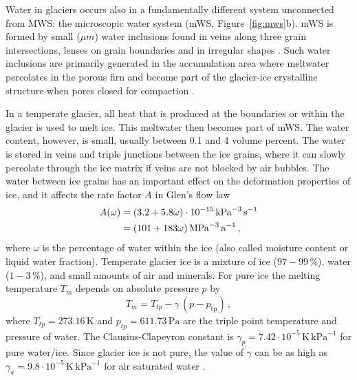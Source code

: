 \documentclass[11pt,a4paper,halfparskip]{scrartcl}
\newcommand{\unit}[1]{\ensuremath{\,\mathrm{#1}}}
\begin{document}
Water in glaciers occurs also in a fundamentally different system unconnected from MWS: the microscopic water system (mWS, Figure~\ref{fig:mws}b). mWS is formed by small ($\mu m$) water inclusions found in veins along three grain intersections, lenses on grain boundaries and in irregular shapes \citep{RaymondHarrison1975,Nye1989,Mader1992,FountainWalder1998}. Such water inclusions are primarily generated in the accumulation area where meltwater percolates in the porous firn and become part of the glacier-ice crystalline structure when pores closed for compaction \citep{Paterson1971,Lliboutry1976,Pettersson2004}.


In a temperate glacier, all heat that is produced at the boundaries or within
the glacier is used to melt ice. This meltwater then becomes part of mWS. The water content, however, is small, usually
between 0.1 and 4 volume percent.  The water is stored in veins and triple
junctions between the ice grains, where it can slowly percolate through the
ice matrix if veins are not blocked by air bubbles.  The water between ice
grains has an important effect on the deformation properties of ice, and it
affects the rate factor $A$ in Glen's flow law \citep{Duval1977,Paterson1994}
%
\begin{align}
 \label{eq:ratefactor-water}
 A(\omega) &= (3.2 + 5.8 \omega) \cdot 10^{-15} \unit{kPa}^{-3}\unit{s}^{-1}
 \notag\\
 &= (101 + 183\omega) \unit{MPa}^{-3}\unit{a}^{-1}\,,
\end{align}
%
where $\omega$ is the percentage of water within the ice (also called moisture content or liquid water fraction).
%
Temperate glacier ice is a mixture of ice ($97-99\unit{\%}$), water
($1-3\unit{\%}$), and small amounts of air and minerals.  For pure ice the
melting temperature $T_m$ depends on absolute pressure $p$ by
%
\begin{equation}
 \label{eq:clausius-pure}
 T_m = T_{tp} - \gamma\, (p - p_{\text{tp}})\,,
\end{equation}
% 
where $T_{tp}=273.16\unit{K}$ and $p_{tp}=611.73\unit{Pa}$ are the triple
point temperature and pressure of water.  The Clausius-Clapeyron constant is
$\gamma_{p}= 7.42 \cdot 10^{-5} \unit{K}\unit{kPa}^{-1}$ for pure water/ice.
Since glacier ice is not pure, the value of $\gamma$ can be as high as
$\gamma_a = 9.8 \cdot 10^{-5} \unit{K}\unit{kPa}^{-1}$ for air saturated water
\citep{Harrison1975a}.

\end{document}
